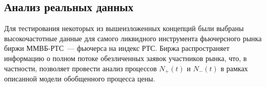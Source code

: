 \begin{multicols}{2}
\section{Анализ реальных данных}

Для тестирования некоторых из вышеизложенных концепций были выбраны
высокочастотные данные для самого ликвидного инструмента фьючерсного
рынка биржи ММВБ-РТС~--- фьючерса на индекс РТС. Биржа распространяет
информацию о полном потоке обезличенных заявок участников рынка,
что, в частности, позволяет провести анализ процессов $N_+(t)$ и
$N_-(t)$ в рамках описанной модели обобщенного процесса цены.

\end{multicols}

\begin{figure} %
\vspace*{1pt}
 \begin{center}
 \mbox{%
 \epsfxsize=114.955mm
 }
 \end{center}
 \vspace*{-9pt}
 \label{fig:price}
\vspace*{12pt}
 \begin{center}
 \mbox{%
 \epsfxsize=112.575mm
 }
 \end{center}
 \vspace*{-9pt}
\label{fig:intens2sides}
\end{figure}


